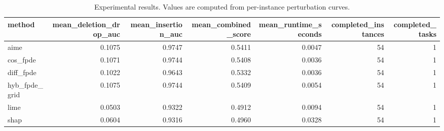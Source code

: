 \begin{table}[t]
\caption{Experimental results. Values are computed from per-instance perturbation curves.}
\label{tab:main_results_computed}
\centering
\begin{tabular}{lrrrrrr}
\toprule
method & mean\_deletion\_drop\_auc & mean\_insertion\_auc & mean\_combined\_score & mean\_runtime\_seconds & completed\_instances & completed\_tasks \\
\midrule
aime & 0.1075 & 0.9747 & 0.5411 & 0.0047 & 54 & 1 \\
cos\_fpde & 0.1071 & 0.9744 & 0.5408 & 0.0036 & 54 & 1 \\
diff\_fpde & 0.1022 & 0.9643 & 0.5332 & 0.0036 & 54 & 1 \\
hyb\_fpde\_grid & 0.1075 & 0.9744 & 0.5409 & 0.0054 & 54 & 1 \\
lime & 0.0503 & 0.9322 & 0.4912 & 0.0094 & 54 & 1 \\
shap & 0.0604 & 0.9316 & 0.4960 & 0.0328 & 54 & 1 \\
\bottomrule
\end{tabular}

\end{table}
